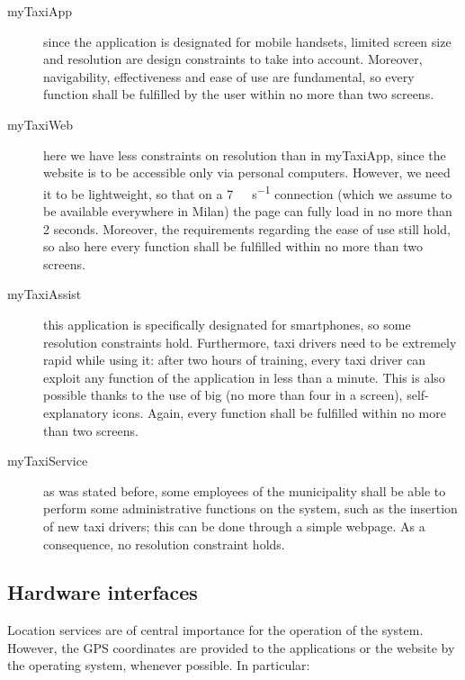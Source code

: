 \begin{description}
	
	\item [myTaxiApp] since the application is designated for mobile handsets, limited screen size and resolution are design constraints to take into account. Moreover, navigability, effectiveness and ease of use are fundamental, so every function shall be fulfilled by the user within no more than two screens.
	
	\item [myTaxiWeb] here we have less constraints on resolution than in myTaxiApp, since the website is to be accessible only via personal computers. However, we need it to be lightweight, so that on a \SI[per-mode=symbol]{7}{\mega\bit\per\second} connection (which we assume to be available everywhere in Milan) the page can fully load in no more than 2 seconds. Moreover, the requirements regarding the ease of use still hold, so also here every function shall be fulfilled within no more than two screens.
	
	\item [myTaxiAssist] this application is specifically designated for smartphones, so some resolution constraints hold. Furthermore, taxi drivers need to be extremely rapid while using it: after two hours of training, every taxi driver can exploit any function of the application in less than a minute. This is also possible thanks to the use of big (no more than four in a screen), self-explanatory icons. Again, every function shall be fulfilled within no more than two screens.
	
	\item [myTaxiService] as was stated before, some employees of the municipality shall be able to perform some administrative functions on the system, such as the insertion of new taxi drivers; this can be done through a simple webpage. As a consequence, no resolution constraint holds.

\end{description}


\subsection{Hardware interfaces}\label{subsec:hardwareInterfaces}
Location services are of central importance for the operation of the system. However, the GPS coordinates are provided to the applications or the website by the operating system, whenever possible. In particular:

